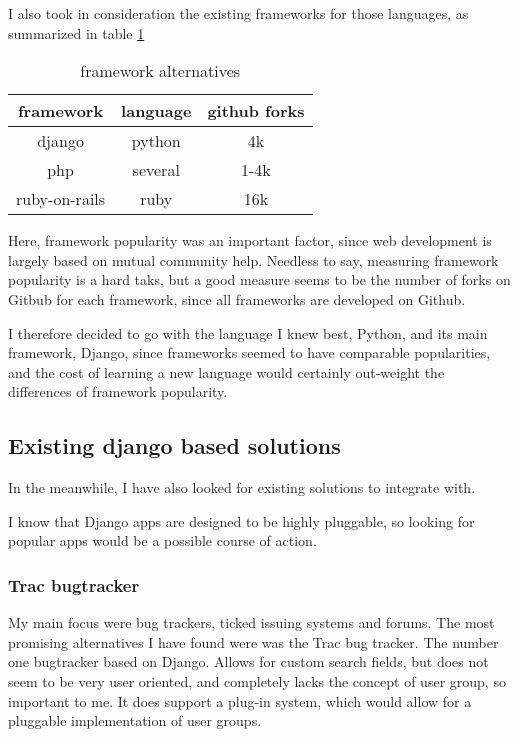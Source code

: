 \documentclass[12pt]{article}
\begin{document}
I also took in consideration the existing frameworks for those languages, as summarized in
table \ref{tab2}

\begin{table}[h]
  \centering
  \begin{tabular}{ccc}
    framework & language & github forks \\  		    
		\hline
		django \cite{DD12} & python & 4k \\
    php & several & 1-4k \\
    ruby-on-rails & ruby & 16k \\
  \end{tabular}
  \caption{framework alternatives}
  \label{tab2}
\end{table}

Here, framework popularity was an important factor, since web development
is largely based on mutual community help. Needless to say, measuring framework
popularity is a hard taks, but a good measure seems to be the number of forks
on Gitbub for each framework, since all frameworks are developed on Github.

I therefore decided to go with the language I knew best, Python, and its main framework,
Django, since frameworks
seemed to have comparable popularities, and the cost of learning a new language
would certainly out-weight the differences of framework popularity.

\subsection{Existing django based solutions}

In the meanwhile, I have also looked for existing solutions to integrate with.

I know that Django apps are designed to be highly pluggable,
so looking for popular apps would be a possible course of action.

\subsubsection{Trac bugtracker}

My main focus were bug trackers, ticked issuing systems and forums. The most promising alternatives I have found were was the Trac bug tracker. The number one bugtracker based on Django. Allows for custom search fields, but does not seem to be very user oriented, and completely lacks the concept of user group, so important to me. It does support a plug-in system, which would allow for a pluggable implementation of user groups.
\end{document}
